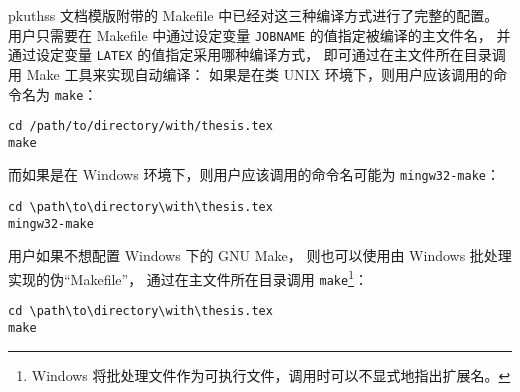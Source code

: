 pkuthss 文档模版附带的 Makefile 中已经对这三种编译方式进行了完整的配置。
用户只需要在 Makefile 中通过设定变量 \verb|JOBNAME| 的值指定被编译的主文件名，
并通过设定变量 \verb|LATEX| 的值指定采用哪种编译方式，
即可通过在主文件所在目录调用 Make 工具来实现自动编译：
如果是在类 UNIX 环境下，则用户应该调用的命令名为 \verb|make|：
\begin{Verbatim}[frame = single]
cd /path/to/directory/with/thesis.tex
make
\end{Verbatim}
而如果是在 Windows 环境下，则用户应该调用的命令名可能为 \verb|mingw32-make|：
\begin{Verbatim}[frame = single]
cd \path\to\directory\with\thesis.tex
mingw32-make
\end{Verbatim}

用户如果不想配置 Windows 下的 GNU Make，
则也可以使用由 Windows 批处理实现的伪“Makefile”，
通过在主文件所在目录调用 \verb|make|\footnote{%
	Windows 将批处理文件作为可执行文件，调用时可以不显式地指出扩展名。%
}：
\begin{Verbatim}[frame = single]
cd \path\to\directory\with\thesis.tex
make
\end{Verbatim}

